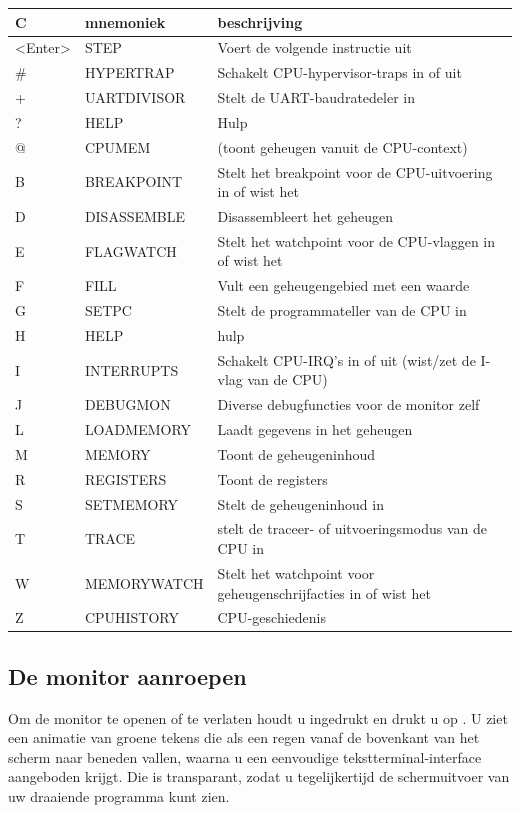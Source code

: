 {
\ttfamily
\setlength{\tabcolsep}{1mm}
\begin{center}
\begin{tabular}{|l|l|L{6.5cm}|}
\hline
C & mnemoniek & beschrijving \\
\hline
<Enter> & STEP & Voert de volgende instructie uit \\\# & HYPERTRAP & Schakelt CPU-hypervisor-traps in of uit \\+ & UARTDIVISOR & Stelt de UART-baudratedeler in \\? & HELP & Hulp \\@ & CPUMEM & (toont geheugen vanuit de CPU-context) \\
\hline
B & BREAKPOINT & Stelt het breakpoint voor de CPU-uitvoering in of wist het \\D & DISASSEMBLE & Disassembleert het geheugen \\E & FLAGWATCH & Stelt het watchpoint voor de CPU-vlaggen in of wist het \\F & FILL & Vult een geheugengebied met een waarde \\G & SETPC & Stelt de programmateller van de CPU in \\H & HELP & hulp \\I & INTERRUPTS & Schakelt CPU-IRQ's in of uit (wist/zet de I-vlag van de CPU) \\J & DEBUGMON & Diverse debugfuncties voor de monitor zelf \\L & LOADMEMORY & Laadt gegevens in het geheugen \\M & MEMORY & Toont de geheugeninhoud \\R & REGISTERS & Toont de registers \\S & SETMEMORY & Stelt de geheugeninhoud in \\T & TRACE & stelt de traceer- of uitvoeringsmodus van de CPU in \\W & MEMORYWATCH & Stelt het watchpoint voor geheugenschrijfacties in of wist het \\Z & CPUHISTORY & CPU-geschiedenis \\
\hline
\end{tabular}
\end{center}
}

\subsection {De monitor aanroepen}

Om de monitor te openen of te verlaten houdt u \megasymbolkey ingedrukt en drukt u op . U ziet een animatie van groene tekens die als een regen vanaf de bovenkant van het scherm naar beneden vallen, waarna u een eenvoudige tekstterminal-interface aangeboden krijgt. Die is transparant, zodat u tegelijkertijd de schermuitvoer van uw draaiende programma kunt zien.

